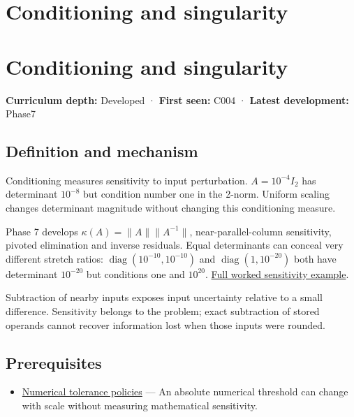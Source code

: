\hypertarget{appendix-8f6a01f284a7}{}
\section*{Conditioning and singularity}
\section{Conditioning and singularity}\label{appendix-8f6a01f284a7-conditioning-and-singularity}

\textbf{Curriculum depth:} Developed · \textbf{First seen:} C004 · \textbf{Latest development:} Phase7

\subsection{Definition and mechanism}\label{appendix-8f6a01f284a7-definition-and-mechanism}

Conditioning measures sensitivity to input perturbation. \(A=10^{-4}I_2\) has determinant \(10^{-8}\) but condition number one in the 2-norm. Uniform scaling changes determinant magnitude without changing this conditioning measure.

Phase 7 develops \(\kappa(A)=\|A\|\|A^{-1}\|\), near-parallel-column sensitivity, pivoted elimination and inverse residuals. Equal determinants can conceal very different stretch ratios: \(\operatorname{diag}(10^{-10},10^{-10})\) and \(\operatorname{diag}(1,10^{-20})\) both have determinant \(10^{-20}\) but conditions one and \(10^{20}\). \hyperref[01-foundations-i-ch018-an-inverse-can-exist-and-still-amplify-uncertainty]{Full worked sensitivity example}.

Subtraction of nearby inputs exposes input uncertainty relative to a small difference. Sensitivity belongs to the problem; exact subtraction of stored operands cannot recover information lost when those inputs were rounded.

\subsection{Prerequisites}\label{appendix-8f6a01f284a7-prerequisites}

\begin{itemize}
\tightlist
\item
  \hyperref[appendix-0ec599f8ba27]{Numerical tolerance policies} --- An absolute numerical threshold can change with scale without measuring mathematical sensitivity.
\end{itemize}


